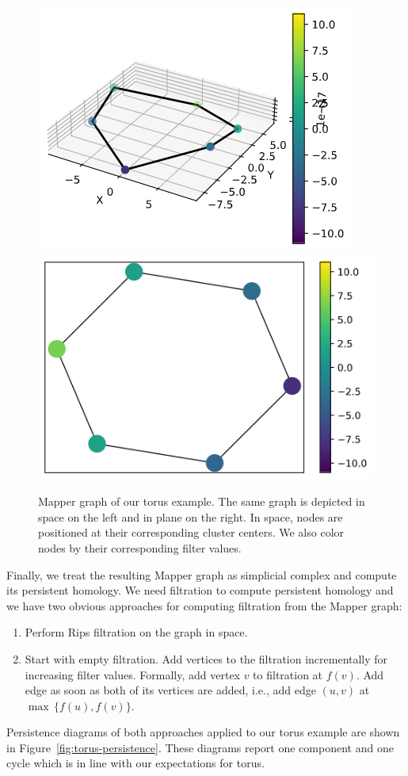 \documentclass{article}
\begin{document}
\begin{figure}[ht]
    \centering
    \includegraphics[align=c, width=0.4\columnwidth]{torus-graph-3d}
    \includegraphics[align=c, width=0.4\columnwidth]{torus-graph-2d}
    \caption{Mapper graph of our torus example.
        The same graph is depicted in space on the left and in plane on the right.
        In space, nodes are positioned at their corresponding cluster centers.
        We also color nodes by their corresponding filter values.}
    \label{fig:torus-mapper}
\end{figure}

Finally, we treat the resulting Mapper graph as simplicial complex and compute its persistent homology.
We need filtration to compute persistent homology and we have two obvious approaches for computing filtration from the Mapper graph:
\begin{enumerate}
    \item Perform Rips filtration on the graph in space.
    \item Start with empty filtration.
          Add vertices to the filtration incrementally for increasing filter values.
          Formally, add vertex $v$ to filtration at $f(v)$.
          Add edge as soon as both of its vertices are added, i.e., add edge $(u, v)$ at $\max\,\{ f(u), f(v) \}$.
\end{enumerate}
Persistence diagrams of both approaches applied to our torus example are shown in Figure~\ref{fig:torus-persistence}.
These diagrams report one component and one cycle which is in line with our expectations for torus.
\end{document}
